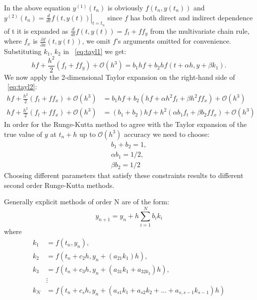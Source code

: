 \documentclass[11pt]{report}
\begin{document}
    In the above equation $y^{(1)}(t_n)$ is obviously $f(t_n, y(t_n))$ and
    $y^{(2)}(t_n) = \left. \frac{d}{dt} f(t, y(t)) \right|_{t=t_n}$ since $f$ has both direct and indirect dependence of t
    it is expanded as $\frac{d}{dt} f(t, y(t)) = f_{t} + ff_{y}$  from the multivariate chain rule, where $f_x$ is
    $\frac{\partial f}{\partial x}(t, y(t))$, we omit $f$'s arguments omitted for convenience.
    Substituting $k_1$, $k_2$ in ~\eqref{eq:tayl1} we get:
    \begin{equation}
        hf + \frac{h^{2}}{2}(f_{t} + ff_{y}) + \mathcal{O}\left(h^{3}\right)
        =
        b_{1}hf + b_{2}hf(t + \alpha h, y + \beta k_{1}).
        \label{eq:tayl2}
    \end{equation}
    We now apply the 2-dimensional Taylor expansion on the right-hand side of ~\eqref{eq:tayl2}:
    \begin{align*}
        hf + \frac{h^{2}}{2}(f_{t} + ff_{x}) + \mathcal{O}\left(h^{3}\right)  &=
        b_{1}hf + b_{2}(hf +\alpha h^{2}f_{t} + \beta h^{2} ff_{x}) + \mathcal{O}\left(h^{3}\right)
        \\
        hf + \frac{h^{2}}{2}(f_{t} + ff_{x}) + \mathcal{O}\left(h^{3}\right)  &=
        (b_{1} + b_{2})hf + h^2 (\alpha b_1 f_{t} + \beta b_2 ff_{x}) + \mathcal{O}\left(h^{3}\right)
    \end{align*}
    In order for the Runge-Kutta method to agree with the Taylor expansion of the true value of $y$ at $t_n + h$ up to
    $\mathcal{O}(h^3)$ accuracy we need to choose:
    \begin{align*}
        b_1 + b_2 = 1, \\
        \alpha b_1 = 1/2, \\
        \beta b_2 = 1/2
    \end{align*}
    Choosing different parameters that satisfy these constraints results to different second order Runge-Kutta methods.

    Generally explicit methods of order N are of the form:
    \begin{equation*}
        y_{n+1} = y_n + h \sum_{i=1}^{N} b_i k_i
    \end{equation*}
    where
    \begin{align}
        k_1 &= f(t_n, y_n), \\
        k_2 &= f(t_n + c_2 h, y_n + (a_{21} k_1) h), \\
        k_3 &= f(t_n + c_3 h, y_n + (a_{31} k_1 + a_{32 k_2})h), \\
        &\vdots \\
        k_N &= f(t_n + c_s h, y_n + (a_{s1}k_1 + a_{s2}k_2 + \dots + a_{s, s-1}k_{s-1})h)
    \end{align}
\end{document}
